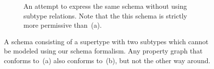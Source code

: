 \documentclass{article}
\begin{document}
\begin{figure}[t]
\begin{subfigure}[t]{0.45\textwidth}
    \caption{An attempt to express the same schema without using subtype relations. Note that the this schema is strictly more permissive than~(a).}
    \label{fig:subtyping-ours}
  \end{subfigure}
  \caption{A schema consisting of a supertype with two subtypes which cannot be modeled using our schema formalism. Any property graph that conforms to~(a) also conforms to~(b), but not the other way around.}
\end{figure}

% 
% 
\end{document}
